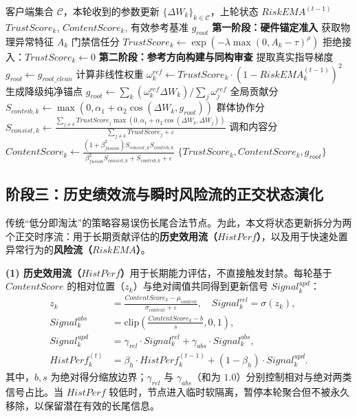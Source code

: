 \documentclass[11pt, a4paper, UTF8, fontset=fandol]{ctexart}
\begin{document}
\begin{algorithm}[htbp]
\caption{基于 TEE 硬件锚点与纯净参考的准入与内容审查}
\label{alg:phase12}
\begin{algorithmic}[1]
\REQUIRE 客户端集合 $\mathcal{C}$，本轮收到的参数更新 $\{\Delta W_k\}_{k\in\mathcal{C}}$，上轮状态 $RiskEMA^{(t-1)}$
\ENSURE $TrustScore_k$, $ContentScore_k$, 有效参考基准 $g_{root}$
\STATE \textbf{第一阶段：硬件锚定准入}
        \STATE 获取物理异常特征 $A_k$
        \STATE 门禁信任分 $TrustScore_k \leftarrow \exp(-\lambda \max(0, A_k-\tau)^\rho)$
    \ELSE
        \STATE 拒绝接入：$TrustScore_k \leftarrow 0$
    \ENDIF
\ENDFOR
\STATE \textbf{第二阶段：参考方向构建与同构审查}
    \STATE 提取真实指导梯度 $g_{root} \leftarrow g_{root\_clean}$
\ELSE
    \STATE 计算非线性权重 $\omega_k^{ref} \leftarrow TrustScore_k \cdot (1 - RiskEMA_k^{(t-1)})^2$
    \STATE 生成降级纯净锚点 $g_{root} \leftarrow \sum_k (\omega_k^{ref} \Delta W_k) / \sum_j \omega_j^{ref}$
\ENDIF
{}
    \STATE 全局贡献分 $S_{contrib,k} \leftarrow \max(0, \alpha_1 + \alpha_2 \cos(\Delta W_k, g_{root}))$
    \STATE 群体协作分 $S_{consist,k} \leftarrow \frac{\sum_{j \neq k} TrustScore_j \max(0, \alpha_1 + \alpha_2 \cos(\Delta W_k, \Delta W_j))}{\sum_{j \neq k} TrustScore_j + \varepsilon}$
    \STATE 调和内容分 $ContentScore_k \leftarrow \frac{(1+\beta_{fusion}^2)S_{consist,k} S_{contrib,k}}{\beta_{fusion}^2 S_{consist,k} + S_{contrib,k} + \varepsilon}$
\ENDFOR
\RETURN $\{TrustScore_k, ContentScore_k, g_{root}\}$
\end{algorithmic}
\end{algorithm}


\subsection{阶段三：历史绩效流与瞬时风险流的正交状态演化}
传统“低分即淘汰”的策略容易误伤长尾合法节点。为此，本文将状态更新拆分为两个正交时序流：用于长期贡献评估的\textbf{历史效用流（$HistPerf$）}，以及用于快速处置异常行为的\textbf{风险流（$RiskEMA$）}。

\textbf{(1) 历史效用流（$HistPerf$）}用于长期能力评估，不直接触发封禁。每轮基于 $ContentScore$ 的相对位置（$z_k$）与绝对阈值共同得到更新信号 $Signal_k^{upd}$：
\begin{align}
    z_{k} &= \frac{ContentScore_{k} - \mu_{content}}{\sigma_{content} + \varepsilon}, \quad Signal_{k}^{rel} = \sigma(z_{k}), \\
    Signal_{k}^{abs} &= \mathrm{clip}\left(\frac{ContentScore_{k} - b}{s}, 0, 1\right), \\
    Signal_{k}^{upd} &= \gamma_{rel} \cdot Signal_{k}^{rel} + \gamma_{abs} \cdot Signal_{k}^{abs}, \\
    HistPerf_{k}^{(t)} &= \beta_{h} \cdot HistPerf_{k}^{(t-1)} + (1 - \beta_{h}) \cdot Signal_{k}^{upd}.
\end{align}
其中，$b,s$ 为绝对得分缩放边界；$\gamma_{rel}$ 与 $\gamma_{abs}$（和为 $1.0$）分别控制相对与绝对两类信号占比。当 $HistPerf$ 较低时，节点进入临时软隔离，暂停本轮聚合但不被永久移除，以保留潜在有效的长尾信息。
\end{document}
